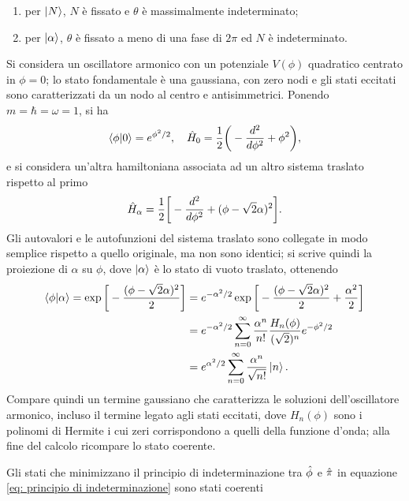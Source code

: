 \begin{enumerate}
    \item per $\ket{N}$, $N$ è fissato e $\theta$ è massimalmente indeterminato;
    \item per $\ket{\alpha}$, $\theta$ è fissato a meno di una fase di $2\pi$ ed $N$ è indeterminato.
\end{enumerate}
\begin{ex}
    Si considera un oscillatore armonico con un potenziale $V(\phi)$ quadratico centrato in $\phi = 0$; lo stato fondamentale è una gaussiana, con zero nodi e gli stati eccitati sono caratterizzati da un nodo al centro e antisimmetrici. Ponendo $m = \hbar = \omega = 1$, si ha
    \begin{equation}
        \langle \phi | 0 \rangle = e^{\phi^2/2},\quad \hat{H}_0 = \frac{1}{2}\bigg(-\frac{d^2}{d\phi^2} + \phi^2\bigg),
    \end{equation}
    e si considera un'altra hamiltoniana associata ad un altro sistema traslato rispetto al primo
    \begin{equation}
        \hat{H}_\alpha = \frac{1}{2}\bigg[-\frac{d^2}{d\phi^2} + (\phi - \sqrt{2}\alpha)^2\bigg].
    \end{equation}
    Gli autovalori e le autofunzioni del sistema traslato sono collegate in modo semplice rispetto a quello originale, ma non sono identici; si scrive quindi la proiezione di $\alpha$ su $\phi$, dove $\ket{\alpha}$ è lo stato di vuoto traslato, ottenendo
    \begin{equation}
        \begin{split}
            \langle \phi | \alpha \rangle = \exp{\bigg[-\frac{(\phi - \sqrt{2}\alpha)^2}{2}\bigg]} &= e^{-\alpha^2/2}\exp{\bigg[-\frac{(\phi - \sqrt{2}\alpha)^2}{2} + \frac{\alpha^2}{2}\bigg]} \\
            &= e^{-\alpha^2/2}\sum_{n=0}^\infty\frac{\alpha^n}{n!}\frac{H_n(\phi)}{(\sqrt{2})^n}e^{-\phi^2/2} \\
            &= e^{\alpha^2/2}\sum_{n=0}^\infty\frac{\alpha^n}{\sqrt{n!}}\ket{n}.
        \end{split}
    \end{equation}
    Compare quindi un termine gaussiano che caratterizza le soluzioni dell'oscillatore armonico, incluso il termine legato agli stati eccitati, dove $H_n(\phi)$ sono i polinomi di Hermite i cui zeri corrispondono a quelli della funzione d'onda; alla fine del calcolo ricompare lo stato coerente. 
\end{ex}
Gli stati che minimizzano il principio di indeterminazione tra $\hat{\phi}$ e $\hat{\pi}$ in equazione \eqref{eq: principio di indeterminazione} sono stati coerenti
